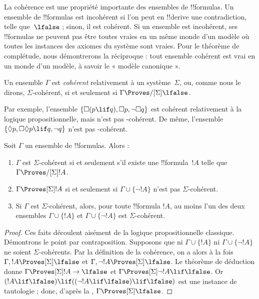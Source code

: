 \documentclass[../../../include/open-logic-section]{subfiles}
\begin{document}


La cohérence est une propriété importante des ensembles de
!!{formula}s. Un ensemble de !!{formula}s est incohérent si l'on peut
en !!{derive} une contradiction, telle que~$\lfalse$ ; sinon, il est
cohérent. Si un ensemble est incohérent, ses !!{formula}s ne peuvent
pas être toutes vraies en un même monde d'un modèle où toutes les instances des axiomes du système sont vraies. Pour le théorème
de complétude, nous démontrerons la réciproque : tout ensemble cohérent
est vrai en un monde d'un modèle, à savoir le « modèle canonique ».

\begin{defn}
  Un ensemble $\Gamma$ est \emph{cohérent} relativement à un
  système~$\Sigma$, ou, comme nous le dirons, $\Sigma$-cohérent, si et
  seulement si $\Gamma \Proves/[\Sigma] \lfalse$.
\end{defn}

Par exemple, l'ensemble $\{ \Box(p \lif q), \Box p, \lnot\Box q \}$
est cohérent relativement à la logique propositionnelle, mais n'est
pas -cohérent. De même, l'ensemble
$\{ \Diamond p, \Box\Diamond p \lif q, \lnot q \}$ n'est pas
-cohérent.

\begin{prop}
  Soit $\Gamma$ un ensemble de !!{formula}s. Alors :
  \begin{enumerate}
  \item $\Gamma$ est $\Sigma$-cohérent si et seulement s'il existe
    une !!{formula}~$!A$ telle que $\Gamma \Proves/[\Sigma]
    !A$.
  \item {}%
    $\Gamma \Proves[\Sigma] !A$ si et seulement si $\Gamma \cup \{
    \lnot!A \}$ n'est pas $\Sigma$-cohérent.
  \item {}%
    Si $\Gamma$ est $\Sigma$-cohérent, alors, pour toute !!{formula}
    $!A$, au moins l'un des deux ensembles $\Gamma \cup \{ !A \}$
    et $\Gamma \cup \{ \lnot!A \}$ est $\Sigma$-cohérent.
  \end{enumerate}
\end{prop}

\begin{proof}
  Ces faits découlent aisément de la logique propositionnelle
  classique. Démontrons le point  par
  contraposition. Supposons que ni $\Gamma \cup \{ !A \}$ ni
  $\Gamma \cup \{ \lnot!A \}$ ne soient $\Sigma$-cohérents. Par la
  définition de la cohérence, on a alors à la fois
  $\Gamma, !A \Proves[\Sigma] \lfalse$ et
  $\Gamma, \lnot !A \Proves[\Sigma] \lfalse$. Le théorème de
  déduction donne $\Gamma \Proves[\Sigma] !A \to \lfalse$ et
  $\Gamma \Proves[\Sigma] \lnot!A \lif \lfalse$. Or
  $(!A \lif \lfalse) \lif ((\lnot!A \lif \lfalse) \lif \lfalse)$ est une
  instance de tautologie ; donc, d'après
  la ,
  $\Gamma \Proves[\Sigma] \lfalse$.
\end{proof}
\end{document}
